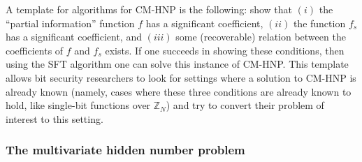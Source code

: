 \documentclass[11pt]{article}
\newtheorem{corollary}[theorem]{Corollary}
\theoremstyle{definition}
\newcommand{\Z}{\mathbb{Z}}
\begin{document}
%


\medskip

A template for algorithms for CM-HNP is the following:
show that $(i)$ the ``partial information'' function $f$ has a significant coefficient, $(ii)$ the function $f_s$ has a significant coefficient, and $(iii)$ some (recoverable) relation between the coefficients of $f$ and $f_s$ exists. If one succeeds in showing these conditions, then using the SFT algorithm one can solve this instance of CM-HNP.
This template allows bit security researchers to look for settings where a solution to CM-HNP is already known (namely, cases where these three conditions are already known to hold, like single-bit functions over $\Z_N$) and try to convert their problem of interest to this setting.


\subsubsection{The multivariate hidden number problem}
\end{document}
